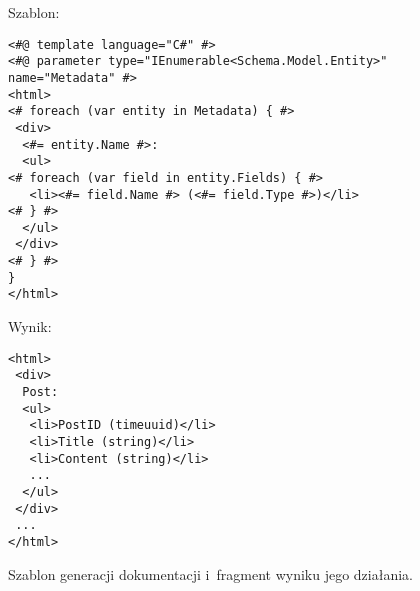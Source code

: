\begin{figure}[!ht]
Szablon:

\begin{verbatim}
<#@ template language="C#" #>
<#@ parameter type="IEnumerable<Schema.Model.Entity>" name="Metadata" #>
<html>
<# foreach (var entity in Metadata) { #>
 <div>
  <#= entity.Name #>:
  <ul>
<# foreach (var field in entity.Fields) { #>
   <li><#= field.Name #> (<#= field.Type #>)</li>
<# } #>
  </ul>
 </div>
<# } #>
}
</html>
\end{verbatim}

Wynik:

\begin{verbatim}
<html>
 <div>
  Post:
  <ul>
   <li>PostID (timeuuid)</li>
   <li>Title (string)</li>
   <li>Content (string)</li>
   ...
  </ul>
 </div>
 ...
</html>
\end{verbatim}

\caption{Szablon generacji dokumentacji i~fragment wyniku jego działania.}
\label{fig:single:template_docs}
\end{figure}
